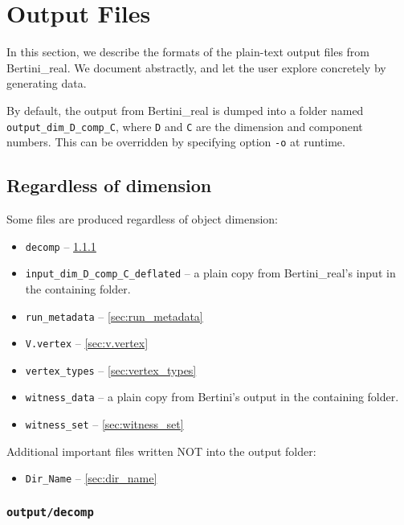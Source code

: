 
\section{Output Files}
\label{sec:output_files}


In this section, we describe the formats of the plain-text output files from Bertini\_real.
We document abstractly, and let the user explore concretely by generating data.

By default, the output from Bertini\_real is dumped into a folder named {\tt output\_dim\_D\_comp\_C}, where {\tt D} and {\tt C} are the dimension and component numbers.  This can be overridden by specifying option {\tt -o} at runtime.







\subsection{Regardless of dimension}
\label{sec:output_dim_free}

Some files are produced regardless of object dimension:

\begin{itemize}
	\item {\tt decomp} -- \ref{sec:decomp}
	\item {\tt input\_dim\_D\_comp\_C\_deflated} -- a plain copy from Bertini\_real's input in the containing folder.
	\item {\tt run\_metadata} -- \ref{sec:run_metadata}
	\item {\tt V.vertex} -- \ref{sec:v.vertex}
	\item {\tt vertex\_types} -- \ref{sec:vertex_types}
	\item {\tt witness\_data} -- a plain copy from Bertini's output in the containing folder.
	\item {\tt witness\_set} -- \ref{sec:witness_set}
\end{itemize}

Additional important files written NOT into the output folder:
\begin{itemize}
	\item {\tt Dir\_Name} -- \ref{sec:dir_name}
\end{itemize}



\clearpage
\subsubsection{\tt output/decomp}
\label{sec:decomp}



